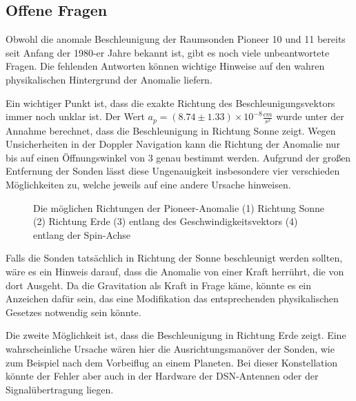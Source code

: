 \subsection{Offene Fragen}\label{fragen}

Obwohl die anomale Beschleunigung der Raumsonden Pioneer 10 und 11
bereits seit Anfang der 1980-er Jahre bekannt ist, gibt es noch viele
unbeantwortete Fragen\cite{Turyshev2010}. Die fehlenden Antworten
k\"onnen wichtige Hinweise auf den wahren physikalischen Hintergrund
der Anomalie liefern.




Ein wichtiger Punkt ist, dass die exakte Richtung des
Beschleunigungsvektors immer noch unklar ist. Der Wert $a_{p}=(8.74\pm
1.33)\times 10^{-8}\frac{\mathit{cm}}{s^{2}}$ wurde unter der Annahme
berechnet, dass die Beschleunigung in Richtung Sonne zeigt. Wegen
Unsicherheiten in der Doppler Navigation kann die Richtung der Anomalie
nur bis auf einen \"Offnungswinkel von 3{\textordmasculine} genau
bestimmt werden. Aufgrund der gro{\ss}en Entfernung der Sonden l\"asst
diese Ungenauigkeit insbesondere vier verschieden M\"oglichkeiten zu,
welche jeweils auf eine andere Ursache hinweisen.


\begin{figure}[htbn]
\begin{center}
\noindent    
{}
\end{center}
\vskip -10pt
  \caption{Die möglichen Richtungen der Pioneer-Anomalie (1) Richtung Sonne (2) Richtung Erde (3) entlang des Geschwindigkeitsvektors (4) entlang der Spin-Achse\cite{Turyshev2010}}
\label{fig:richtung}
\end{figure} 



Falls die Sonden tats\"achlich in Richtung der Sonne beschleunigt werden
sollten, w\"are es ein Hinweis darauf, dass die Anomalie von einer
Kraft herr\"uhrt, die von dort Ausgeht. Da die Gravitation als Kraft in
Frage k\"ame, k\"onnte es ein Anzeichen daf\"ur sein, das eine
Modifikation das entsprechenden physikalischen Gesetzes notwendig
sein könnte.




Die zweite M\"oglichkeit ist, dass die Beschleunigung in Richtung Erde
zeigt. Eine wahrscheinliche Ursache w\"aren hier die
Ausrichtungsman\"over der Sonden, wie zum Beispiel nach dem Vorbeiflug
an einem Planeten. Bei dieser Konstellation k\"onnte der Fehler aber
auch in der Hardware der DSN-Antennen oder der Signal\"ubertragung
liegen.




